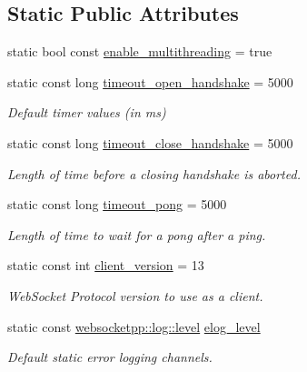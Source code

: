 \subsection*{Static Public Attributes}
\begin{DoxyCompactItemize}
\item 
static bool const \hyperlink{structwebsocketpp_1_1config_1_1core__client_a20e354b545c8af8bd55ed076f42cb1d7}{enable\+\_\+multithreading} = true
\item 
static const long \hyperlink{structwebsocketpp_1_1config_1_1core__client_aad4057440517a8586c2dfebdbca0936c}{timeout\+\_\+open\+\_\+handshake} = 5000
\begin{DoxyCompactList}\small\item\em Default timer values (in ms) \end{DoxyCompactList}\item 
static const long \hyperlink{structwebsocketpp_1_1config_1_1core__client_aa9c3092633bdd220e4a8d9f9ce1581ef}{timeout\+\_\+close\+\_\+handshake} = 5000
\begin{DoxyCompactList}\small\item\em Length of time before a closing handshake is aborted. \end{DoxyCompactList}\item 
static const long \hyperlink{structwebsocketpp_1_1config_1_1core__client_aecd2b27b526691e483d986711f655065}{timeout\+\_\+pong} = 5000
\begin{DoxyCompactList}\small\item\em Length of time to wait for a pong after a ping. \end{DoxyCompactList}\item 
static const int \hyperlink{structwebsocketpp_1_1config_1_1core__client_afa438e9269e4bd4bc3815979e0de0083}{client\+\_\+version} = 13
\begin{DoxyCompactList}\small\item\em Web\+Socket Protocol version to use as a client. \end{DoxyCompactList}\item 
static const \hyperlink{namespacewebsocketpp_1_1log_a12d4d17939f102db8c9183d400a41960}{websocketpp\+::log\+::level} \hyperlink{structwebsocketpp_1_1config_1_1core__client_a653fda222bcedbaff664e60a517d0fa9}{elog\+\_\+level}
\begin{DoxyCompactList}\small\item\em Default static error logging channels. \end{DoxyCompactList}\item 

\end{DoxyCompactItemize}
